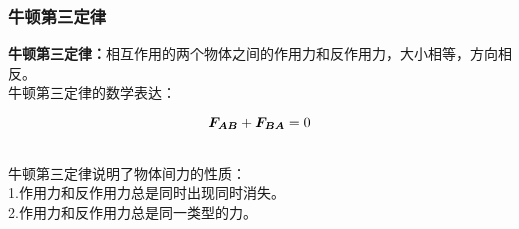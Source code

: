 \documentclass[UTF8]{ctexart}
\newcommand*{\veb}[1]{\vb*{#1}}
\begin{document}
\subsubsection{牛顿第三定律}
    \textbf{牛顿第三定律：}相互作用的两个物体之间的作用力和反作用力，大小相等，方向相反。\\[3mm]
    牛顿第三定律的数学表达：
    \begin{large}
        \begin{equation*}
            \veb{F_{AB}}+\veb{F_{BA}}=0
        \end{equation*}
    \end{large}\\
    牛顿第三定律说明了物体间力的性质：\\[3mm]
    1.作用力和反作用力总是同时出现同时消失。\\[3mm]
    2.作用力和反作用力总是同一类型的力。

\newpage
\end{document}
